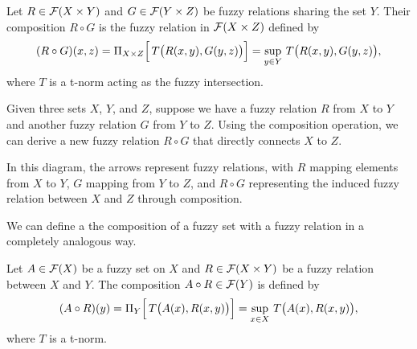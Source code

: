 \begin{definition}
    Let \( R \in \mathcal{F}(X \times Y) \) and \( G \in \mathcal{F}(Y \times Z) \) be fuzzy relations sharing the set \(Y\). Their composition \( R \circ G \) is the fuzzy relation in \(\mathcal{F}(X \times Z)\) defined by
    \[
    (R \circ G)(x,z) = \Pi_{X\times Z}\Bigl[\, T\bigl(R(x,y), G(y,z)\bigr) \Bigr] = \sup_{y\in Y}\, T\bigl(R(x,y), G(y,z)\bigr),
    \]
    where \(T\) is a t-norm acting as the fuzzy intersection.
\end{definition}



Given three sets \(X\), \(Y\), and \(Z\), suppose we have a fuzzy relation \(R\) from \(X\) to \(Y\) and another fuzzy relation \(G\) from \(Y\) to \(Z\). Using the composition operation, we can derive a new fuzzy relation \(R \circ G\) that directly connects \(X\) to \(Z\).

\noindent
\begin{minipage}{0.7\textwidth}
In this diagram, the arrows represent fuzzy relations, with \(R\) mapping elements from \(X\) to \(Y\), \(G\) mapping from \(Y\) to \(Z\), and \(R \circ G\) representing the induced fuzzy relation between \(X\) and \(Z\) through composition.\\
\end{minipage}%
\begin{minipage}{0.3\textwidth}
  \begin{center}
  \end{center}

\end{minipage}


We can define a the composition of a fuzzy set with a fuzzy relation in a completely analogous way. 

\begin{definition}
    Let \( A \in \mathcal{F}(X) \) be a fuzzy set on \(X\) and \( R \in \mathcal{F}(X \times Y) \) be a fuzzy relation between \(X\) and \(Y\). The composition \( A \circ R \in \mathcal{F}(Y) \) is defined by
    \[
    (A \circ R)(y) = \Pi_{Y}\Bigl[\, T\bigl( A(x), R(x,y) \bigr) \Bigr] = \sup_{x \in X}\, T\bigl( A(x), R(x,y) \bigr),
    \]
    where \(T\) is a t-norm.
\end{definition}



